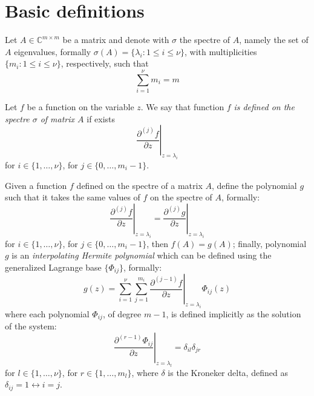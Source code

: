 
\section*{Basic definitions}

Let $A\in\mathbb{C}^{m\times m}$ be a matrix and denote with $\sigma$ the spectre of $A$, namely the set of $A$ eigenvalues, 
formally $\sigma(A) = \lbrace \lambda_{i}: 1\leq i\leq \nu\rbrace$,
with multiplicities $\lbrace m_{i}: 1\leq i\leq \nu\rbrace$, respectively, such that
\begin{displaymath}
\sum_{i=1}^{\nu}{m_{i}}=m
\end{displaymath}

Let $f$ be a function on the variable $z$. We say that function $f$ 
\emph{is defined on the spectre $\sigma$ of matrix $A$} if exists
    \begin{displaymath}
        \left. \frac{\partial^{(j)}{f}}{\partial{z}} \right|_{z=\lambda_{i}}
    \end{displaymath}
for $i\in \lbrace 1, \ldots, \nu \rbrace$, for $j \in \lbrace 0, \ldots, m_{i}-1 \rbrace$.    

Given a function $f$ defined on the spectre of a matrix $A$, define the polynomial $g$ such that
it takes the same values of $f$ on the spectre of $A$, formally:
    \begin{displaymath}
        \left. \frac{\partial^{(j)}{f}}{\partial{z}} \right|_{z=\lambda_{i}} =
        \left. \frac{\partial^{(j)}{g}}{\partial{z}} \right|_{z=\lambda_{i}}
    \end{displaymath}
for $i\in \lbrace 1, \ldots, \nu \rbrace$, for $j \in \lbrace 0, \ldots, m_{i}-1 \rbrace$,
then $f(A) = g(A)$; finally, polynomial $g$ is an \emph{interpolating Hermite polynomial} which
can be defined using the generalized Lagrange base $ \lbrace \Phi_{ij} \rbrace$, formally:
\begin{displaymath}
g(z) = \sum_{i=1}^{\nu}{\sum_{j=1}^{m_{i}}{
        \left. \frac{\partial^{(j-1)}{f}}{\partial{z}} \right|_{z=\lambda_{i}}\Phi_{ij}(z)
    }}
\end{displaymath}
where each polynomial $\Phi_{ij}$, of degree $m-1$, is defined implicitly as the solution of the system:
\begin{displaymath}
    \left. \frac{\partial^{(r-1)}{\Phi_{ij}}}{\partial{z}} \right|_{z=\lambda_{l}} = \delta_{il}\delta_{jr}
\end{displaymath}
for $l\in \lbrace 1, \ldots, \nu \rbrace$, for $r \in \lbrace 1, \ldots, m_{l} \rbrace$, where
$\delta$ is the Kroneker delta, defined as $\delta_{ij}=1 \leftrightarrow i=j$.

